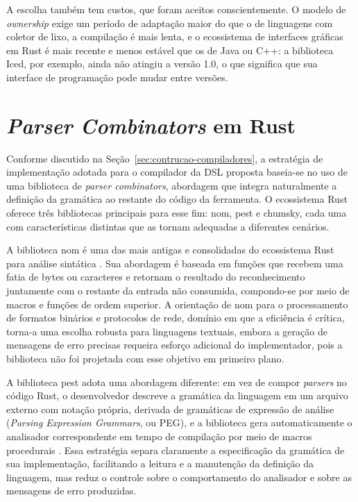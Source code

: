 \documentclass[
    12pt
    ,oneside
    ,a4paper
    ,chapter=TITLE
    ,section=TITLE
    ,sumario=abnt-6027-2012]{abntex2}
\begin{document}
A escolha também tem custos, que foram aceitos conscientemente. O modelo de
\textit{ownership} exige um período de adaptação maior do que o de linguagens com coletor de
lixo, a compilação é mais lenta, e o ecossistema de interfaces gráficas em Rust é mais recente
e menos estável que os de Java ou C++: a biblioteca Iced, por exemplo, ainda não atingiu a
versão 1.0, o que significa que sua interface de programação pode mudar entre versões.

\section{\textit{Parser Combinators} em Rust}
\label{sec:rust-parsers}

Conforme discutido na Seção~\ref{sec:contrucao-compiladores}, a estratégia de implementação
adotada para o compilador da DSL proposta baseia-se no uso de uma biblioteca de
\textit{parser combinators}, abordagem que integra naturalmente a definição da gramática ao
restante do código da ferramenta. O ecossistema Rust oferece três bibliotecas principais para
esse fim: nom, pest e chumsky, cada uma com características
distintas que as tornam adequadas a diferentes cenários.

A biblioteca nom é uma das mais antigas e consolidadas do ecossistema Rust para
análise sintática \cite{couprie2015nom}. Sua abordagem é baseada em funções que recebem uma
fatia de bytes ou caracteres e retornam o resultado do reconhecimento juntamente com o restante
da entrada não consumida, compondo-se por meio de macros e funções de ordem superior. A
orientação de nom para o processamento de formatos binários e protocolos de rede, domínio em
que a eficiência é crítica, torna-a uma escolha robusta para linguagens textuais, embora a
geração de mensagens de erro precisas requeira esforço adicional do implementador, pois a
biblioteca não foi projetada com esse objetivo em primeiro plano.

A biblioteca pest adota uma abordagem diferente: em vez de compor \textit{parsers} no
código Rust, o desenvolvedor descreve a gramática da linguagem em um arquivo externo com
notação própria, derivada de gramáticas de expressão de análise (\textit{Parsing Expression
Grammars}, ou PEG), e a biblioteca gera automaticamente o analisador correspondente em tempo de
compilação por meio de macros procedurais \cite{pest2018}. Essa estratégia separa claramente a
especificação da gramática de sua implementação, facilitando a leitura e a manutenção da
definição da linguagem, mas reduz o controle sobre o comportamento do analisador e sobre as
mensagens de erro produzidas.
\end{document}
